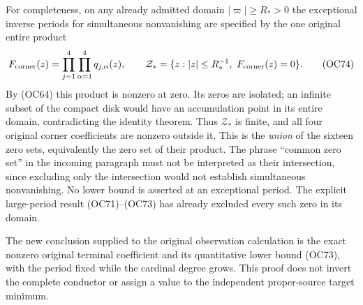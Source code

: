 For completeness, on any already admitted domain $|\varpi|\ge R_*>0$
the exceptional inverse periods for simultaneous nonvanishing are
specified by the one original entire product
\[
 F_{\rm corner}(z)=\prod_{j=1}^4\prod_{\alpha=1}^4q_{j,\alpha}(z),
 \qquad
 \mathcal Z_*=
 \{z:|z|\le R_*^{-1},\ F_{\rm corner}(z)=0\}.
 \tag{OC74}\label{hzoc:eq:OC74}
\]
By (OC64) this product is nonzero at zero. Its zeros are isolated;
an infinite subset of the compact disk would have an accumulation point
in its entire domain, contradicting the identity theorem. Thus
$\mathcal Z_*$ is finite, and all four original corner coefficients
are nonzero outside it. This is the \emph{union} of the sixteen
zero sets, equivalently the zero set of their product. The phrase
``common zero set'' in the incoming paragraph must not be interpreted as
their intersection, since excluding only the intersection would not
establish simultaneous nonvanishing. No lower bound is asserted at an
exceptional period. The explicit large-period result (OC71)--(OC73)
has already excluded every such zero in its domain.

The new conclusion supplied to the original observation calculation is
the exact nonzero original terminal coefficient and its quantitative
lower bound (OC73), with the period fixed while the cardinal degree grows.
This proof does not invert the complete conductor or assign a value to
the independent proper-source target minimum.


